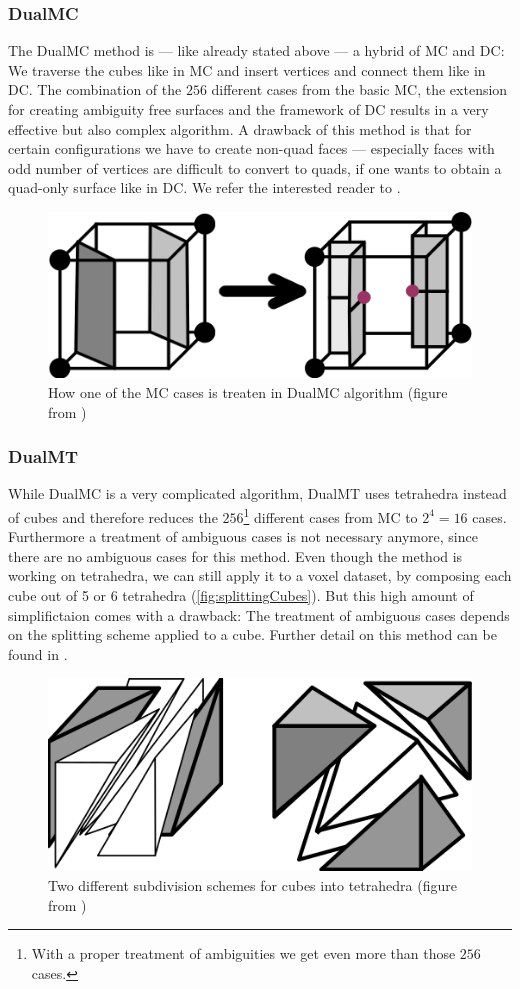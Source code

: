 \subsubsection{\acl{DualMC}}
The \acf{DualMC} method is --- like already stated above --- a hybrid of \ac{MC} and \ac{DC}: We traverse the cubes like in \ac{MC} and insert vertices and connect them like in \ac{DC}. The combination of the $256$ different cases from the basic \ac{MC}, the extension for creating ambiguity free surfaces and the framework of \ac{DC} results in a very effective but also complex algorithm. A drawback of this method is that for certain configurations we have to create non-\ac{quad} faces --- especially faces with odd number of vertices are difficult to convert to \acp{quad}, if one wants to obtain a \ac{quad}-only surface like in \ac{DC}. We refer the interested reader to  \cite{Nielson2004, Zhang2012}.

\begin{figure}
\begin{center}
\includegraphics[width = .5\textwidth]{Pictures/SurfaceReconstruction/MCtoDualMC.png}
\end{center}
\caption{How one of the \ac{MC} cases is treaten in \ac{DualMC} algorithm (figure from \cite{Nielson2004})}
\end{figure}

\subsubsection{\acl{DualMT}}
While \ac{DualMC} is a very complicated algorithm, \acf{DualMT} uses tetrahedra instead of cubes and therefore reduces the $256$\footnote{With a proper treatment of ambiguities we get even more than those $256$ cases.} different cases from \ac{MC} to $2^4=16$ cases. Furthermore a treatment of ambiguous cases is not necessary anymore, since there are no ambiguous cases for this method.
Even though the method is working on tetrahedra, we can still apply it to a voxel dataset, by composing each cube out of 5 or 6 tetrahedra (\autoref{fig:splittingCubes}). But this high amount of simplifictaion comes with a drawback: The treatment of ambiguous cases depends on the splitting scheme applied to a cube. Further detail on this method can be found in \cite{Nielson2008}.

\begin{figure}
\begin{center}
\includegraphics[width = .5 \textwidth]{Pictures/SurfaceReconstruction/SplittingCubes.png}
\caption{Two different subdivision schemes for cubes into tetrahedra (figure from \cite{Nielson2008})}
\label{fig:splittingCubes}
\end{center}
\end{figure}